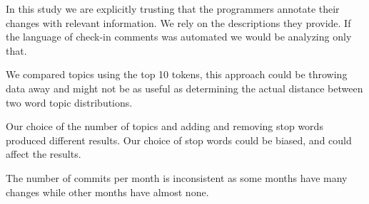 \documentclass[times, 10pt,twocolumn]{article}
\newcommand{\shrinkit}{\vspace*{-.3em}}
\begin{document}


\shrinkit
{}
\shrinkit

In this study we are explicitly trusting that the programmers annotate
their changes with relevant information. We rely on the descriptions
they provide. If the language of check-in comments was automated we
would  be analyzing only that.

We compared topics using the top 10 tokens, this approach could be
throwing data away and might not be as useful as determining the
actual distance between two word topic distributions.


Our choice of the number of topics and adding and removing stop words
produced different results. Our choice of stop words could be biased,
and could affect the results.


The number of commits per month is inconsistent as some months have
many changes while other months have almost none.



\end{document}
